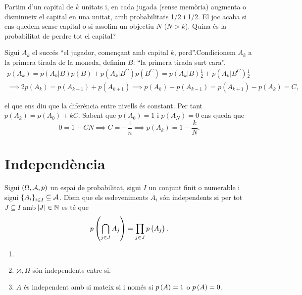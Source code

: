 \begin{problema}
    Partim d'un capital de $k$ unitats i, en cada jugada (sense memòria) augmenta o disminueix el capital en una unitat,
    amb probabilitats 1/2 i 1/2. El joc acaba si ens quedem sense capital o si assolim un objectiu $N$ ($N>k$).
    Quina és la probabilitat de perdre tot el capital?
\end{problema}
\begin{sol}
    Sigui $A_k$ el succés ``el jugador, començant amb capital $k$, perd''.Condicionem $A_k$ a la primera tirada de la moneda, 
    definim $B$: ``la primera tirada surt cara''.
    \begin{gather*}
      p(A_k) = p(A_k|B)p(B) + p(A_k|B^C)p(B^C) = p(A_k|B)\frac{1}{2} + p(A_k|B^C)\frac{1}{2}\\
      \implies 2p(A_k)=p(A_{k-1}) + p(A_{k+1}) \implies p(A_k) - p(A_{k-1}) = p(A_{k+1}) - p(A_k) = C,
    \end{gather*}

    el que ens diu que la diferència entre nivells és constant. Per tant $p(A_k) = p(A_0)+kC$. Sabent que $p(A_0)=1$ i $p(A_N)=0$ ens queda que
    \[0 = 1 + CN \implies C = -\frac{1}{n} \implies p(A_k) = 1 - \frac{k}{N}.\]
\end{sol}


\section{Independència}

\begin{defi}
    Sigui $\left( \Omega, \mathcal{A}, p\right)$ un espai de probabilitat, sigui $I$ un conjunt finit o numerable i sigui $\left\{ A_i\right\}_{i\in I} \subseteq \mathcal{A}$. Diem que els esdeveniments $A_i$ són independents si per tot $J\subseteq I$ amb $\abs{J}\in\mathbb{N}$ es té que
    \[
        p\left(\bigcap_{j\in J} A_j\right) = \prod_{j\in J} p\left( A_j\right).
    \]
\end{defi}

\begin{example}
    \begin{enumerate}[1.]
        \item[]
        \item $\varnothing, \Omega$ són independents entre si.
        \item $A$ és independent amb si mateix si i només si $p\left( A\right)=1$ o $p\left( A\right) =0$.
    \end{enumerate}
\end{example}




